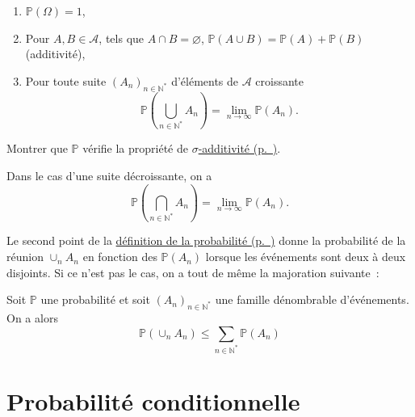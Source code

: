 \begin{enumerate}
\def\labelenumi{\arabic{enumi}.}
\tightlist
\item
  \(\mathbb{P}(\Omega) = 1\),
\item
  Pour \(A, B \in \mathcal{A}\), tels que \(A\cap B = \varnothing\),
  \(\mathbb{P}(A\cup B)= \mathbb{P}(A) + \mathbb{P}(B)\) (additivité),
\item
  Pour toute suite \((A_n)_{n\in\mathbb{N}^\ast}\) d'éléments de
  \(\mathcal{A}\) croissante
  \[\mathbb{P}\left(\bigcup_{n\in\mathbb{N}^\ast} A_n\right) = \lim_{n \rightarrow \infty} \mathbb{P}(A_n).\]
\end{enumerate}

Montrer que \(\mathbb{P}\) vérifie la propriété de
\protect\hyperref[I-defproba]{\(\sigma\)-additivité (p.~\pageref*{I-defproba})}.

\begin{remarque}\label{I-suite-duxe9croissante}

Dans le cas d'une suite décroissante, on a
\[ \mathbb{P}\left(\bigcap_{n \in \mathbb{N}^\ast} A_n\right) = \lim_{n \rightarrow \infty} \mathbb{P}(A_n).\]

Le second point de la \protect\hyperref[I-defproba]{définition de la
probabilité (p.~\pageref*{I-defproba})} donne la probabilité de la
réunion \(\cup_n A_n\) en fonction des \(\mathbb{P}(A_n)\) lorsque les
événements sont deux à deux disjoints. Si ce n'est pas le cas, on a tout
de même la majoration suivante~:
\end{remarque}

\begin{proposition}\label{I-une-majoration-bien-utile}

Soit \(\mathbb{P}\) une probabilité et soit
\((A_n)_{n\in \mathbb{N}^\ast}\) une famille dénombrable d'événements.
On a alors
\[ \mathbb{P}(\cup_n A_n) \leq \sum_{n\in\mathbb{N}^\ast} \mathbb{P}(A_n) \]
\end{proposition}

\label{I-boolinf}

\section{Probabilité
conditionnelle}\label{I-probabilituxe9-conditionnelle}

